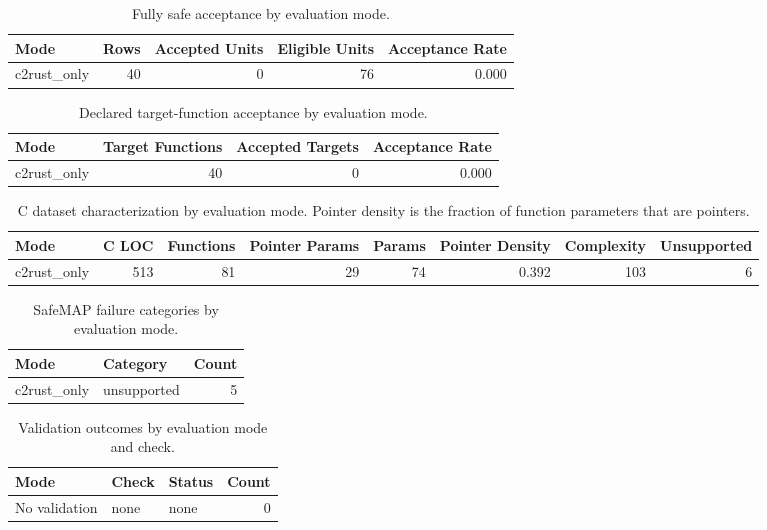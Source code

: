 \begin{table}[t]
\centering
\caption{Fully safe acceptance by evaluation mode.}
\label{tab:safemap-mode-summary}
\begin{tabular}{lrrrr}
\hline
Mode & Rows & Accepted Units & Eligible Units & Acceptance Rate \\
\hline
c2rust\_only & 40 & 0 & 76 & 0.000 \\
\hline
\end{tabular}
\end{table}

\begin{table}[t]
\centering
\caption{Declared target-function acceptance by evaluation mode.}
\label{tab:safemap-target-summary}
\begin{tabular}{lrrr}
\hline
Mode & Target Functions & Accepted Targets & Acceptance Rate \\
\hline
c2rust\_only & 40 & 0 & 0.000 \\
\hline
\end{tabular}
\end{table}

\begin{table}[t]
\centering
\caption{C dataset characterization by evaluation mode. Pointer density is the fraction of function parameters that are pointers.}
\label{tab:safemap-dataset-characterization}
\begin{tabular}{lrrrrrrr}
\hline
Mode & C LOC & Functions & Pointer Params & Params & Pointer Density & Complexity & Unsupported \\
\hline
c2rust\_only & 513 & 81 & 29 & 74 & 0.392 & 103 & 6 \\
\hline
\end{tabular}
\end{table}

\begin{table}[t]
\centering
\caption{SafeMAP failure categories by evaluation mode.}
\label{tab:safemap-failure-summary}
\begin{tabular}{llr}
\hline
Mode & Category & Count \\
\hline
c2rust\_only & unsupported & 5 \\
\hline
\end{tabular}
\end{table}

\begin{table}[t]
\centering
\caption{Validation outcomes by evaluation mode and check.}
\label{tab:safemap-validation-statuses}
\begin{tabular}{lllr}
\hline
Mode & Check & Status & Count \\
\hline
No validation & none & none & 0 \\
\hline
\end{tabular}
\end{table}
